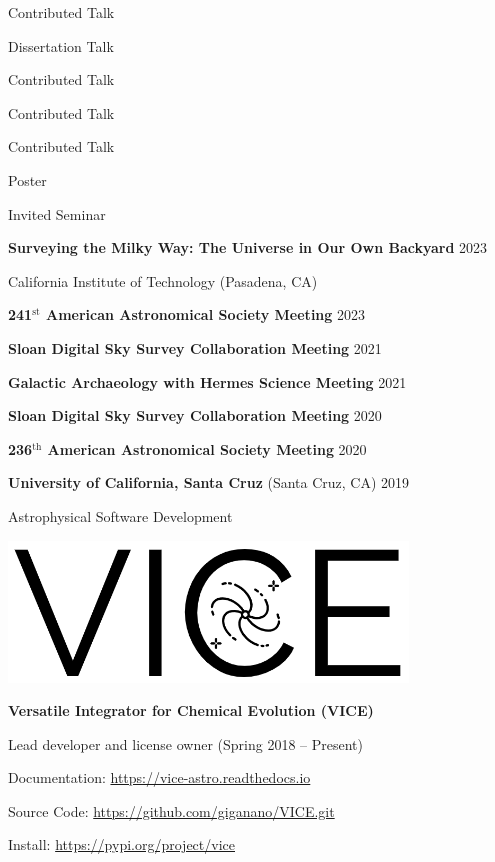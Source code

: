 \documentclass[cv.tex]{subfiles}
\begin{document}
\newpage
\noindent
\parbox{0.18\textwidth}{%
	\raggedleft
	Contributed Talk \par
	\null \par
	Dissertation Talk \par
	Contributed Talk \par
	Contributed Talk \par
	Contributed Talk \par
	Poster \par
	Invited Seminar \par
}
\hspace{1mm}
\parbox{0.8\textwidth}{%
	\vspace{1mm}
	\textbf{Surveying the Milky Way: The Universe in Our Own Backyard}
	\hfill 2023 \par
	California Institute of Technology (Pasadena, CA) \par
	\textbf{241$^\text{st}$ American Astronomical Society Meeting}
	\hfill 2023 \par
	\textbf{Sloan Digital Sky Survey Collaboration Meeting}
	\hfill 2021 \par
	\textbf{Galactic Archaeology with Hermes Science Meeting}
	\hfill 2021 \par
	\textbf{Sloan Digital Sky Survey Collaboration Meeting}
	\hfill 2020 \par
	\textbf{236$^\text{th}$ American Astronomical Society Meeting}
	\hfill 2020 \par
	\textbf{University of California, Santa Cruz} (Santa Cruz, CA) \hfill 2019
	\par
}



\vspace{4mm}
\noindent
{\color{themecolor} \large Astrophysical Software Development}
\par\noindent
\parbox{0.35\textwidth}{%
	\centering
	\includegraphics[scale = 0.33]{vice-logo.png}
}
\parbox{0.63\textwidth}{%
	\textbf{Versatile Integrator for Chemical Evolution (VICE)} \par
	Lead developer and license owner (Spring 2018 -- Present) \par
	Documentation: \url{https://vice-astro.readthedocs.io} \par
	Source Code: \url{https://github.com/giganano/VICE.git} \par
	Install: \url{https://pypi.org/project/vice}
}
\end{document}
